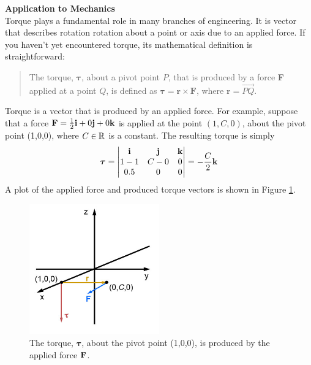 \item \textbf{Application to Mechanics} \\
Torque plays a fundamental role in many branches of engineering. It is vector that describes rotation rotation about a point or axis due to an applied force. If you haven't yet encountered torque, its mathematical definition is straightforward:
\begin{quote}
The torque, $\boldsymbol\tau$, about a pivot point $P$, that is produced by a force \textbf{F} applied at a point $Q$, is defined as $\boldsymbol\tau = \mathbf{r} \times \mathbf{F}$, where $\mathbf{r}=\overrightarrow{PQ}$.
\end{quote}
Torque is a vector that is produced by an applied force. For example, suppose that a force $\mathbf{F}=\frac{1}{2}\mathbf{i} + 0\mathbf{j} + 0\mathbf{k}$ is applied at the point $(1,C,0)$, about the pivot point (1,0,0), where $C\in\mathbb{R}$ is a constant. The resulting torque is simply 
\begin{align*}
\boldsymbol\tau =   
\begin{vmatrix}
   \mathbf{i} &  \mathbf{j} &  \mathbf{k} \\
   1-1 &  C-0 &  0 \\
   0.5 & 0 &  0 \\
  \end{vmatrix}=-\frac{C}{2}\mathbf{k}
\end{align*} 
A plot of the applied force and produced torque vectors is shown in Figure \ref{FigTorque}.
\begin{figure}[!htbp]
  \begin{center}
    \includegraphics[width=0.5\textwidth]{ImgTorqueExample.jpg}
          \caption{\small{The torque, $\boldsymbol\tau$, about the pivot point (1,0,0), is produced by the applied force $\mathbf{F}$.\label{FigTorque} }}
  \end{center}
\end{figure}

